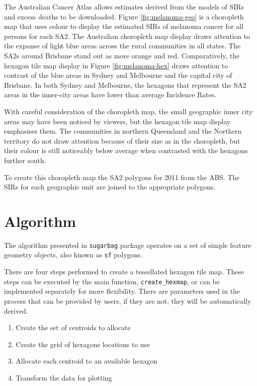 \documentclass{monashthesis}
\begin{document}
The Australian Cancer Atlas \autocite{TACA} allows estimates derived from the models of SIRs and excess deaths to be downloaded.
Figure \ref{fig:melanoma-geo} is a choropleth map that uses colour to display the estimated SIRs of melanoma cancer for all persons for each SA2. The Australian choropleth map display draws attention to the expanse of light blue areas across the rural communities in all states. The SA2s around Brisbane stand out as more orange and red.
Comparatively, the hexagon tile map display in Figure \ref{fig:melanoma-hex} draws attention to contrast of the blue areas in Sydney and Melbourne and the capital city of Brisbane. In both Sydney and Melbourne, the hexagons that represent the SA2 areas in the inner-city areas have lower than average Incidence Rates.

With careful consideration of the choropleth map, the small geographic inner city areas may have been noticed by viewers, but the hexagon tile map display emphasises them. The communities in northern Queensland and the Northern territory do not draw attention because of their size as in the choropleth, but their colour is still noticeably below average when contrasted with the hexagons further south.

To create this choropleth map the SA2 polygons for 2011 from the ABS. The SIRs for each geographic unit are joined to the appropriate polygons.

\hypertarget{algorithm-1}{%
\section{Algorithm}\label{algorithm-1}}

The algorithm presented in \texttt{sugarbag} package operates on a set of simple feature geometry objects, also known as \texttt{sf} \autocite{sf} polygons.

There are four steps performed to create a tessellated hexagon tile map.
These steps can be executed by the main function, \texttt{create\_hexmap}, or can be implemented separately for more flexibility. There are parameters used in the process that can be provided by users, if they are not, they will be automatically derived.

\begin{enumerate}
\def\labelenumi{\arabic{enumi}.}
\tightlist
\item
  Create the set of centroids to allocate
\item
  Create the grid of hexagons locations to use
\item
  Allocate each centroid to an available hexagon
\item
  Transform the data for plotting
\end{enumerate}
\end{document}
